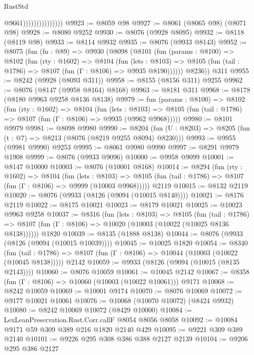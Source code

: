 \begin{lexlean}{RustStd}
\begin{coremodule}
                                  @9661)))))))))))))))
@9923 := @8059 @98
@9927 := @8061 (@8065 @98) (@8071 @98)
@9928 := @8080 @9252
@9930 := @8076 (@9928 @8095)
@9932 := @8118 (@8119 @98)
@9933 := @8114 @9932
@9935 := @8076 (@9933 @8143)
@9952 := @8075
    (fun (fn : @89) =>
    @9930
      (@8098
        (@8101
          (fun (params : @8100) =>
          @8102
            (fun (rty : @1602) =>
            @8104
              (fun (lets : @8103) =>
              @8105 (fun (tail : @1786) => @8107 (fun (Γ : @8106) => @9935 @8190))))))
        @8236))
    @311
@9955 := @8242 (@9928 (@8093 @311))
@9958 := @8155 (@8156 @311) @9255
@9962 := @8076 (@8147 (@9958 @8164) @8168)
@9963 := @8181 @311
@9968 := @8178 (@8180 @9963 @9258 @8136 @8138)
@9979 := fun (params : @8100) =>
  @8102
    (fun (rty : @1602) =>
    @8104
      (fun (lets : @8103) =>
      @8105 (fun (tail : @1786) => @8107 (fun (Γ : @8106) => @9935 (@9962 @9968)))))
@9980 := @8101 @9979
@9981 := @8098 @9980
@9990 := @8204 (fun (U : @8203) => @8205 (fun (t : @7) => @8213 (@8076 (@8219 @9255 @8094) @8230)))
@9993 := @9955 (@9981 @9990) @9253
@9995 := @8061 @9980 @9990
@9997 := @8291 @9979 @1908
@9999 := @8076 (@9933 @9096)
@10000 := @9958 @9099
@10001 := @8147 @10000
@10003 := @8076 (@10001 @8168)
@10014 := @8294
    (fun (rty : @1602) =>
    @8104
      (fun (lets : @8103) =>
      @8105 (fun (tail : @1786) => @8107 (fun (Γ : @8106) => @9999 (@10003 @9968)))))
    @2119
@10015 := @8132 @2119
@10020 := @8076 (@9933 (@8126 (@9094 (@10015 @8140))))
@10021 := @8176 @2119
@10022 := @8175 @10021
@10023 := @8179 @10021
@10025 := @10023 @9963 @9258
@10037 := @8316
    (fun (lets : @8103) =>
    @8105
      (fun (tail : @1786) =>
      @8107 (fun (Γ : @8106) => @10020 (@10003 (@10022 (@10025 @8136 @8138))))))
    @1820
@10039 := @8135 (@1888 @8138)
@10044 := @8076 (@9933 (@8126 (@9094 (@10015 @10039))))
@10045 := @10025 @1820
@10054 := @8340
    (fun (tail : @1786) => @8107 (fun (Γ : @8106) => @10044 (@10003 (@10022 (@10045 @8138)))))
    @2142
@10059 := @9933 (@8126 (@9094 (@10015 (@8135 @2143))))
@10060 := @8076 @10059
@10061 := @10045 @2142
@10067 := @8358 (fun (Γ : @8106) => @10060 (@10003 (@10022 @10061))) @9171
@10068 := @8242 @10059
@10069 := @10001 @9174
@10070 := @8076 @10069
@10072 := @9177 @10021 @10061
@10076 := @10068 (@10070 @10072) (@8424 @9932)
@10080 := @8242 @10069 @10072 (@8429 @10000)
@10084 := LexLeanPreservation.Rust.Corr.callF @8054 @8056 @8058
@10092 := @10084 @9171 @59 @309 @389 @216 @1820 @2140 @429
@10095 := @9221 @309 @389 @2140
@10101 := @9226 @295 @308 @386 @388 @2127 @2139
@10104 := @9206 @295 @386 @2127

\end{coremodule}
\end{lexlean}
